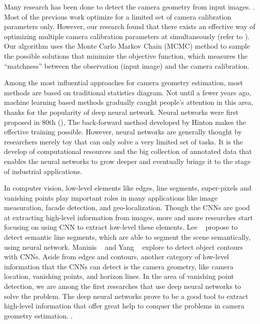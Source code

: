Many research has been done to detect the camera
geometry from input images. . Most of the
previous work optimize for a limited set of camera calibration
parameters only. However, our research found that there exists an
effective way of optimizing multiple camera calibration parameters at
simultaneously (refer to ). Our algorithm uses the Monte
Carlo Markov Chain (MCMC) method to sample the possible solutions that
minimize the objective function, which measures the ``matchness''
between the observation (input image) and the camera calibration.

Among the most influential approaches for camera geometry estimation,
most methods are based on traditional statistics diagram. Not until a
fewer years ago, machine learning based methods gradually caught
people's attention in this area, thanks for the popularity of deep
neural network. Neural networks were first proposed in 80th
(), The back-forward method developed by Hinton
 makes the effective training possible. However, neural
networks are generally thought by researchers merely toy that can only
solve a very limited set of tasks. It is the develop of computational
resources and the big collection of annotated data that enables the
neural networks to grow deeper and eventually brings it to the stage of
industrial applications.

In computer vision, low-level elements like edges, line segments,
super-pixels and vanishing points play important roles in many
applications like image measuration, facade detection, and
geo-localization.
Though the CNNs are good at extracting high-level information from
images, more and more researches start focusing on using CNN to
extract low-level these elements.
%
Lee \etal~\cite{lee2017semantic} propose to detect semantic line
segments, which are able to segment the scene semantically, using
neural network. Maninis \etal~\cite{maninis2016convolutional} and Yang
\etal~\cite{yang2016object} explore to detect object contours with
CNNs.
%
Aside from edges and contours, another category of low-level
information that the CNNs can detect is the camera geometry, like
camera location, vanishing points, and horizon lines.
%
In the area of vanishing point detection, we are among the first
researches that use deep neural networks to solve the problem. The
deep neural networks prove to be a good tool to extract high-level
information that offer great help to conquer the problems in camera
geometry estimation. .

